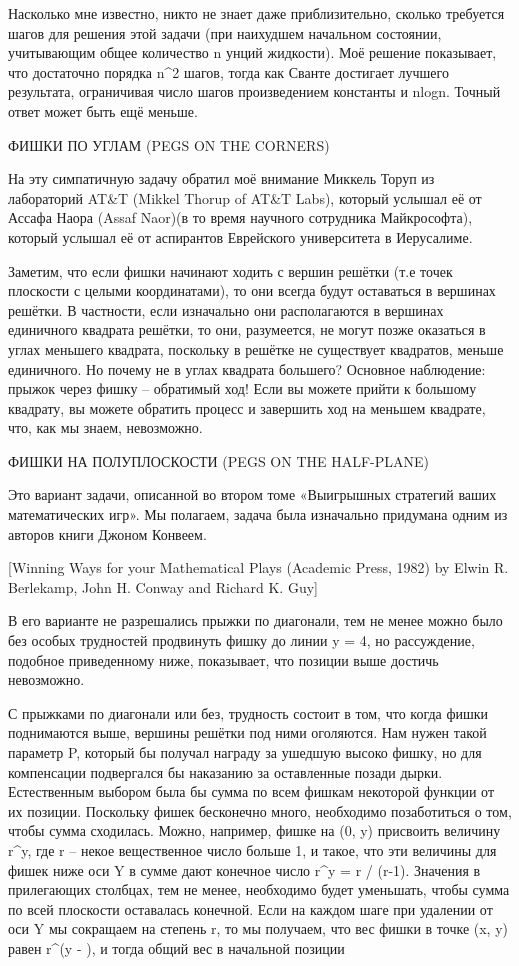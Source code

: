   Насколько мне известно, никто не знает даже приблизительно, сколько требуется шагов для решения этой задачи (при наихудшем начальном состоянии, учитывающим общее количество n унций жидкости). Моё решение показывает, что достаточно порядка n^2 шагов, тогда как  Сванте достигает лучшего результата, ограничивая число шагов произведением константы и nlogn. Точный ответ может быть ещё меньше.




ФИШКИ ПО УГЛАМ (PEGS ON THE CORNERS)


    На эту симпатичную задачу обратил моё внимание Миккель Торуп из лабораторий AT&T (Mikkel Thorup of AT&T Labs), который услышал её от Ассафа Наора (Assaf Naor)(в то время научного сотрудника Майкрософта), который услышал её от аспирантов  Еврейского университета в Иерусалиме.


    Заметим, что если фишки начинают ходить с вершин решётки (т.е точек плоскости с целыми координатами), то они всегда будут оставаться в вершинах решётки. 
   В частности, если изначально они располагаются в вершинах единичного квадрата решётки, то они, разумеется, не могут позже оказаться в углах меньшего квадрата, поскольку в решётке не существует квадратов, меньше единичного. Но почему не в углах квадрата большего?
  Основное наблюдение: прыжок через фишку -- обратимый ход! Если вы можете прийти к большому квадрату, вы можете обратить процесс и завершить ход на меньшем квадрате, что, как мы знаем, невозможно.


ФИШКИ НА ПОЛУПЛОСКОСТИ (PEGS ON THE HALF-PLANE)


  Это вариант задачи, описанной во втором томе  «Выигрышных стратегий ваших математических игр». Мы полагаем, задача была изначально придумана одним из авторов книги Джоном Конвеем.


[Winning Ways for your Mathematical Plays (Academic Press, 1982) by Elwin R. Berlekamp, John H. Conway and Richard K. Guy]    


В его варианте не разрешались прыжки по диагонали, тем не менее можно было без особых трудностей продвинуть фишку до линии y = 4, но рассуждение, подобное приведенному ниже, показывает, что позиции выше достичь невозможно.


  С прыжками по диагонали или без, трудность состоит в том, что когда фишки  поднимаются выше, вершины решётки под ними оголяются. Нам нужен такой параметр P, который бы получал награду за ушедшую высоко фишку, но для компенсации подвергался бы наказанию за оставленные позади дырки. Естественным выбором была бы сумма по всем фишкам некоторой функции от их позиции. Поскольку фишек бесконечно много, необходимо позаботиться о том, чтобы сумма сходилась.
  Можно, например, фишке на (0, y) присвоить величину r^y, где r -- некое вещественное число больше 1, и такое, что эти величины для фишек ниже оси Y в сумме дают конечное число r^y = r / (r-1). Значения в прилегающих столбцах, тем не менее, необходимо будет уменьшать, чтобы сумма по всей плоскости оставалась конечной. Если на каждом шаге при удалении от оси Y мы сокращаем на степень r, то мы получаем, что вес фишки в точке (x, y)  равен r^(y - ), и тогда общий вес в начальной позиции 


